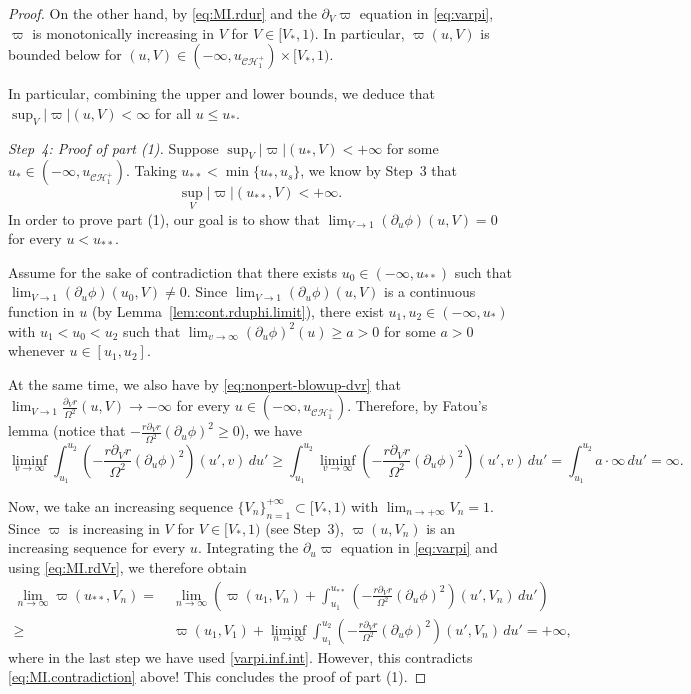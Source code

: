 \documentclass[10pt, reqno]{amsart}
\theoremstyle{definition}
\theoremstyle{remark}
\numberwithin{equation}{section}
\newcommand{\rd}{\partial}
\newcommand{\0}{\emptyset}
\newcommand{\Omg}{\Omega}
\newcommand{\calC}{\mathcal C}
\newcommand{\calH}{\mathcal H}
\newcommand{\f}{\frac}
\newcommand{\CH}{\calC \calH^{+}}		%
\newcommand{\pfstep}[1]{\vspace{.5em} {\it #1.}}
\begin{document}
\begin{proof}
On the other hand, by \eqref{eq:MI.rdur} and the $\rd_V \varpi$ equation in \eqref{eq:varpi}, $\varpi$ is monotonically increasing in $V$ for $V \in [V_*,1)$. In particular, $\varpi(u,V)$ is bounded below for $(u,V) \in (-\infty, u_{\CH_1}) \times [V_*, 1)$.

In particular, combining the upper and lower bounds, we deduce that $\sup_{V}|\varpi|(u,V) <\infty$ for all $u\leq u_*$.

\pfstep{Step~4: Proof of part (1)} Suppose $\sup_{V}|\varpi|(u_*,V) < +\infty$ for some $u_* \in (-\infty, u_{\CH_1})$. Taking $u_{**} < \min\{u_*, u_s\}$, we know by Step~3 that 
\begin{equation}\label{eq:MI.contradiction}
\sup_{V}|\varpi|(u_{**},V) < +\infty. 
\end{equation}
In order to prove part (1), our goal is to show that $\lim_{V\to 1}(\rd_u\phi)(u,V)=0$ for every $u< u_{**}$.

Assume for the sake of contradiction that there exists $u_0\in (-\infty,u_{**})$ such that $\lim_{V\to 1}(\rd_u\phi)(u_0,V)\neq 0$. Since $\lim_{V\to 1}(\rd_u\phi)(u,V)$ is a continuous function in $u$ (by Lemma~\ref{lem:cont.rduphi.limit}), there exist $u_1, u_2\in (-\infty,u_*)$ with $u_1<u_0<u_2$ such that $\lim_{v\to \infty}(\rd_u\phi)^2(u)\geq a>0$ for some $a>0$ whenever $u\in [u_1,u_2]$.

At the same time, we also have by \eqref{eq:nonpert-blowup-dvr} that $\lim_{V\to 1}\f{\rd_V r}{\Omg^2}(u,V)\to -\infty$ for every $u \in (-\infty, u_{\CH_1})$. 
Therefore, by Fatou's lemma (notice that $-\f{r\rd_V r}{\Omg^2}(\rd_u\phi)^2\geq 0$), we have
\begin{equation}\label{varpi.inf.int}
\liminf_{v\to \infty} \int_{u_1}^{u_2} (-\f{r\rd_V r}{\Omg^2}(\rd_u\phi)^2)(u',v)\, du'\geq  \int_{u_1}^{u_2} \liminf_{v\to \infty}(-\f{r\rd_V r}{\Omg^2}(\rd_u\phi)^2)(u',v)\, du'=\int_{u_1}^{u_2}a\cdot\infty\,du'=\infty.
\end{equation}

Now, we take an increasing sequence $\{V_n\}_{n=1}^{+\infty} \subset [V_*, 1)$ with $\lim_{n\to +\infty} V_n = 1$. Since $\varpi$ is increasing in $V$ for $V \in [V_*,1)$ (see Step~3), $\varpi(u, V_n)$ is an increasing sequence for every $u$. Integrating the $\rd_u \varpi$ equation in \eqref{eq:varpi} and using \eqref{eq:MI.rdVr}, we therefore obtain
\begin{equation*}
\begin{split}
\lim_{n\to\infty}\varpi(u_{**},V_n) =&\: \lim_{n\to\infty}\left(\varpi(u_1,V_n)+\int_{u_1}^{u_{**}} (-\f{r\rd_V r}{\Omg^2}(\rd_u\phi)^2)(u',V_n)\, du'\right)\\
\geq &\: \varpi(u_1,V_1)+\liminf_{n\to\infty}\int_{u_1}^{u_2} (-\f{r\rd_V r}{\Omg^2}(\rd_u\phi)^2)(u',V_n)\, du'=+\infty,
\end{split}
\end{equation*}
where in the last step we have used \eqref{varpi.inf.int}. However, this contradicts \eqref{eq:MI.contradiction} above! This concludes the proof of part (1).


\end{proof}
\end{document}
